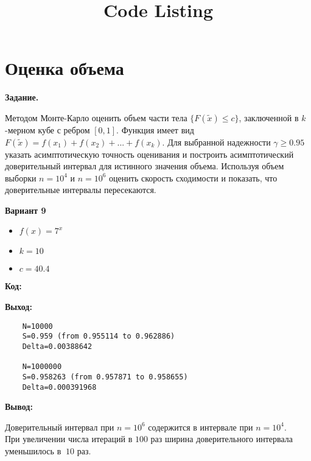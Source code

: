\documentclass{article}
\title{Code Listing}
\begin{document}
	\section{Оценка объема}
	{\bf Задание.}
	
	Методом Монте-Карло оценить объем части тела $\{F(\tilde x)\leq c\}$, заключенной в $k$-мерном кубе с ребром $[0,1]$. Функция имеет вид $F(\tilde x) = f(x_1) + f(x_2) + ... + f(x_k)$. Для выбранной надежности $\gamma\geqslant 0.95$ указать асимптотическую точность оценивания и построить асимптотический доверительный интервал для истинного значения объема.  
	Используя объем выборки $n=10^4$  и  $n=10^6$ оценить скорость сходимости и показать, что доверительные интервалы пересекаются.
	
	\bigskip
	
	{\bf Вариант 9}
	\begin{itemize}
		\item $f(x) = 7^x$
		\item $k = 10$
		\item $c = 40.4$ 
	\end{itemize}
	
	{\bf Код:}
	
	
	
	{\bf Выход:}
	
	\begin{lstlisting}
	N=10000
	S=0.959 (from 0.955114 to 0.962886)
	Delta=0.00388642
	
	N=1000000
	S=0.958263 (from 0.957871 to 0.958655)
	Delta=0.000391968
	\end{lstlisting}
	
	{\bf Вывод:}
	
	Доверительный интервал при $n = 10^6$ содержится в интервале при $n = 10^4$.\\
	При увеличении числа итераций в $100$ раз ширина доверительного интервала уменьшилось в $~10$ раз.
	
	\newpage
	
\end{document}
